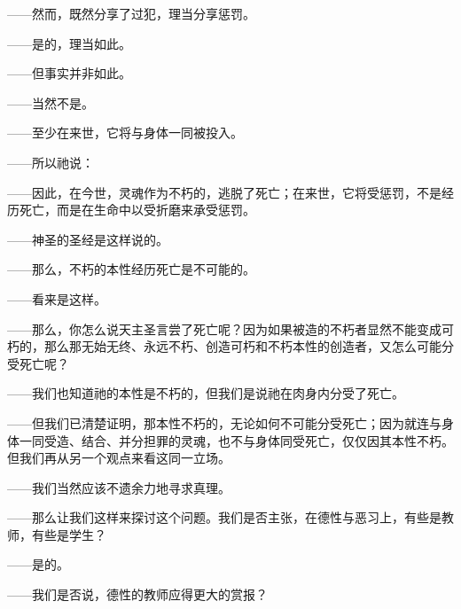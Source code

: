 ——然而，既然分享了过犯，理当分享惩罚。\par

——是的，理当如此。\par

——但事实并非如此。\par

——当然不是。\par

——至少在来世，它将与身体一同被投入。\par

——所以祂说：\par

——因此，在今世，灵魂作为不朽的，逃脱了死亡；在来世，它将受惩罚，不是经历死亡，而是在生命中以受折磨来承受惩罚。\par

——神圣的圣经是这样说的。\par

——那么，不朽的本性经历死亡是不可能的。\par

——看来是这样。\par

——那么，你怎么说天主圣言尝了死亡呢？因为如果被造的不朽者显然不能变成可朽的，那么那无始无终、永远不朽、创造可朽和不朽本性的创造者，又怎么可能分受死亡呢？\par

——我们也知道祂的本性是不朽的，但我们是说祂在肉身内分受了死亡。\par

——但我们已清楚证明，那本性不朽的，无论如何不可能分受死亡；因为就连与身体一同受造、结合、并分担罪的灵魂，也不与身体同受死亡，仅仅因其本性不朽。但我们再从另一个观点来看这同一立场。\par

——我们当然应该不遗余力地寻求真理。\par

——那么让我们这样来探讨这个问题。我们是否主张，在德性与恶习上，有些是教师，有些是学生？\par

——是的。\par

——我们是否说，德性的教师应得更大的赏报？\par

